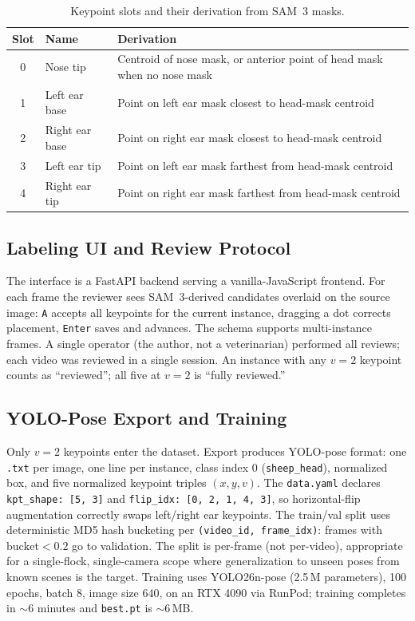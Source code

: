 \documentclass[11pt]{article}
\begin{document}
\begin{table}[t]
  \centering
  \caption{Keypoint slots and their derivation from SAM~3 masks.}
  \label{tab:kpts}
  \begin{tabular}{c l p{}}
    \toprule
    Slot & Name & Derivation \\
    \midrule
    0 & Nose tip & Centroid of nose mask, or anterior point of head mask when no nose mask \\
    1 & Left ear base & Point on left ear mask closest to head-mask centroid \\
    2 & Right ear base & Point on right ear mask closest to head-mask centroid \\
    3 & Left ear tip & Point on left ear mask farthest from head-mask centroid \\
    4 & Right ear tip & Point on right ear mask farthest from head-mask centroid \\
    \bottomrule
  \end{tabular}
\end{table}

\subsection{Labeling UI and Review Protocol}
The interface is a FastAPI backend serving a vanilla-JavaScript frontend. For
each frame the reviewer sees SAM~3-derived candidates overlaid on the source
image: \texttt{A} accepts all keypoints for the current instance, dragging a dot
corrects placement, \texttt{Enter} saves and advances. The schema supports
multi-instance frames. A single operator (the author, not a veterinarian)
performed all reviews; each video was reviewed in a single session. An instance
with any $v{=}2$ keypoint counts as ``reviewed''; all five at $v{=}2$ is ``fully
reviewed.''

\subsection{YOLO-Pose Export and Training}
Only $v{=}2$ keypoints enter the dataset. Export produces YOLO-pose format: one
\texttt{.txt} per image, one line per instance, class index 0
(\texttt{sheep\_head}), normalized box, and five normalized keypoint triples
$(x,y,v)$. The \texttt{data.yaml} declares \texttt{kpt\_shape: [5, 3]} and
\texttt{flip\_idx: [0, 2, 1, 4, 3]}, so horizontal-flip augmentation correctly
swaps left/right ear keypoints. The train/val split uses deterministic MD5 hash
bucketing per \texttt{(video\_id, frame\_idx)}: frames with
$\text{bucket} < 0.2$ go to validation. The split is per-frame (not per-video),
appropriate for a single-flock, single-camera scope where generalization to
unseen poses from known scenes is the target. Training uses YOLO26n-pose (2.5\,M
parameters), 100 epochs, batch 8, image size 640, on an RTX 4090 via RunPod;
training completes in ${\sim}6$ minutes and \texttt{best.pt} is ${\sim}6$\,MB.
\end{document}
